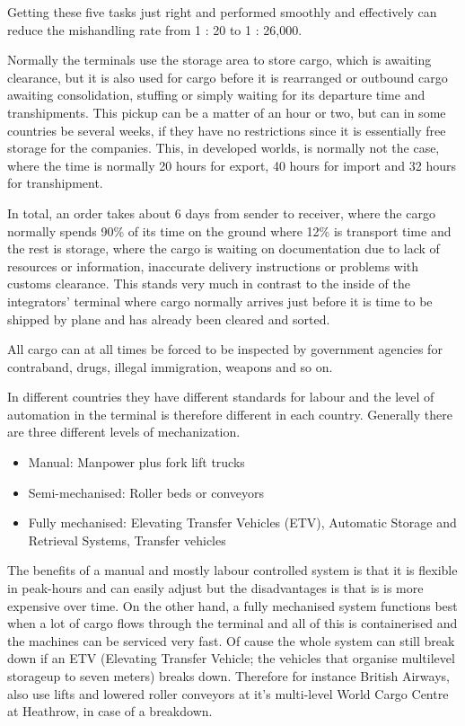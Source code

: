 Getting these five tasks just right and performed smoothly and effectively can reduce the mishandling rate from 1 : 20 to 1 : 26,000.

Normally the terminals use the storage area to store cargo, which is awaiting clearance, but it is also used for cargo before it is rearranged or outbound cargo awaiting consolidation, stuffing or simply waiting for its departure time and transhipments. This pickup can be a matter of an hour or two, but can in some countries be several weeks, if they have no restrictions since it is essentially free storage for the companies. This, in developed worlds, is normally not the case, where the time is normally 20 hours for export, 40 hours for import and 32 hours for transhipment. %

In total, an order takes about 6 days from sender to receiver, where the cargo normally spends 90\% of its time on the ground where 12\% is transport time and the rest is storage, where the cargo is waiting on documentation due to lack of resources or information, inaccurate delivery instructions or problems with customs clearance. This stands very much in contrast to the inside of the integrators' terminal where cargo normally arrives just before it is time to be shipped by plane and has already been cleared and sorted.%

All cargo can at all times be forced to be inspected by government agencies for contraband, drugs, illegal immigration, weapons and so on.

In different countries they have different standards for labour and the level of automation in the terminal is therefore different in each country. Generally there are three different levels of mechanization.
\begin{itemize}
\item Manual: Manpower plus fork lift trucks
\item Semi-mechanised: Roller beds or conveyors
\item Fully mechanised: Elevating Transfer Vehicles (ETV), Automatic Storage and Retrieval Systems, Transfer vehicles
\end{itemize}

The benefits of a manual and mostly labour controlled system is that it is flexible in peak-hours and can easily adjust but the  disadvantages is that is is more expensive over time.
On the other hand, a fully mechanised system functions best when a lot of cargo flows through the terminal and all of this is containerised and the machines can be serviced very fast. Of cause the whole system can still break down if an ETV (Elevating Transfer Vehicle; the vehicles that organise multilevel storageup to seven meters) breaks down.  Therefore for instance British Airways, also use lifts and lowered roller conveyors at it's multi-level World Cargo Centre at Heathrow, in case of a breakdown.

